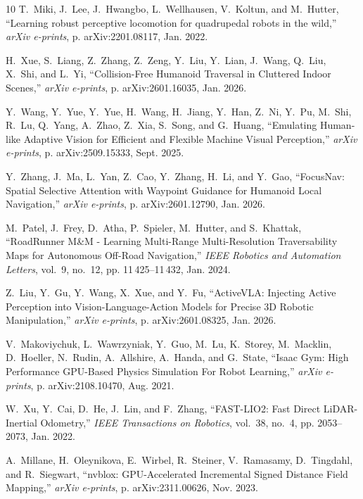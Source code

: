 \documentclass[letterpaper, 10 pt, conference]{ieeeconf/ieeeconf}
\begin{document}
\begin{thebibliography}{10}
T.~{Miki}, J.~{Lee}, J.~{Hwangbo}, L.~{Wellhausen}, V.~{Koltun}, and
  M.~{Hutter}, ``{Learning robust perceptive locomotion for quadrupedal robots
  in the wild},'' \emph{arXiv e-prints}, p. arXiv:2201.08117, Jan. 2022.

H.~{Xue}, S.~{Liang}, Z.~{Zhang}, Z.~{Zeng}, Y.~{Liu}, Y.~{Lian}, J.~{Wang},
  Q.~{Liu}, X.~{Shi}, and L.~{Yi}, ``{Collision-Free Humanoid Traversal in
  Cluttered Indoor Scenes},'' \emph{arXiv e-prints}, p. arXiv:2601.16035, Jan.
  2026.

Y.~{Wang}, Y.~{Yue}, Y.~{Yue}, H.~{Wang}, H.~{Jiang}, Y.~{Han}, Z.~{Ni},
  Y.~{Pu}, M.~{Shi}, R.~{Lu}, Q.~{Yang}, A.~{Zhao}, Z.~{Xia}, S.~{Song}, and
  G.~{Huang}, ``{Emulating Human-like Adaptive Vision for Efficient and
  Flexible Machine Visual Perception},'' \emph{arXiv e-prints}, p.
  arXiv:2509.15333, Sept. 2025.

Y.~{Zhang}, J.~{Ma}, L.~{Yan}, Z.~{Cao}, Y.~{Zhang}, H.~{Li}, and Y.~{Gao},
  ``{FocusNav: Spatial Selective Attention with Waypoint Guidance for Humanoid
  Local Navigation},'' \emph{arXiv e-prints}, p. arXiv:2601.12790, Jan. 2026.

M.~{Patel}, J.~{Frey}, D.~{Atha}, P.~{Spieler}, M.~{Hutter}, and S.~{Khattak},
  ``{RoadRunner M\&M - Learning Multi-Range Multi-Resolution Traversability
  Maps for Autonomous Off-Road Navigation},'' \emph{IEEE Robotics and
  Automation Letters}, vol.~9, no.~12, pp. 11\,425--11\,432, Jan. 2024.

Z.~{Liu}, Y.~{Gu}, Y.~{Wang}, X.~{Xue}, and Y.~{Fu}, ``{ActiveVLA: Injecting
  Active Perception into Vision-Language-Action Models for Precise 3D Robotic
  Manipulation},'' \emph{arXiv e-prints}, p. arXiv:2601.08325, Jan. 2026.

V.~{Makoviychuk}, L.~{Wawrzyniak}, Y.~{Guo}, M.~{Lu}, K.~{Storey},
  M.~{Macklin}, D.~{Hoeller}, N.~{Rudin}, A.~{Allshire}, A.~{Handa}, and
  G.~{State}, ``{Isaac Gym: High Performance GPU-Based Physics Simulation For
  Robot Learning},'' \emph{arXiv e-prints}, p. arXiv:2108.10470, Aug. 2021.

W.~{Xu}, Y.~{Cai}, D.~{He}, J.~{Lin}, and F.~{Zhang}, ``{FAST-LIO2: Fast Direct
  LiDAR-Inertial Odometry},'' \emph{IEEE Transactions on Robotics}, vol.~38,
  no.~4, pp. 2053--2073, Jan. 2022.

A.~{Millane}, H.~{Oleynikova}, E.~{Wirbel}, R.~{Steiner}, V.~{Ramasamy},
  D.~{Tingdahl}, and R.~{Siegwart}, ``{nvblox: GPU-Accelerated Incremental
  Signed Distance Field Mapping},'' \emph{arXiv e-prints}, p. arXiv:2311.00626,
  Nov. 2023.

\end{thebibliography}


% 
\end{document}
